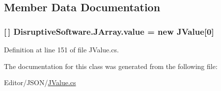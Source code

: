 \subsection{Member Data Documentation}
\hypertarget{class_disruptive_software_1_1_j_array_a48b8805731cda932460723d7ae020284}{
\subsubsection[{value}]{ \mbox{[}$\,$\mbox{]} Disruptive\+Software.\+J\+Array.\+value = new {\bf J\+Value}\mbox{[}0\mbox{]}}}\label{class_disruptive_software_1_1_j_array_a48b8805731cda932460723d7ae020284}


Definition at line 151 of file J\+Value.\+cs.



The documentation for this class was generated from the following file\+:\begin{DoxyCompactItemize}
\item 
Editor/\+J\+S\+O\+N/\hyperlink{_j_value_8cs}{J\+Value.\+cs}\end{DoxyCompactItemize}
